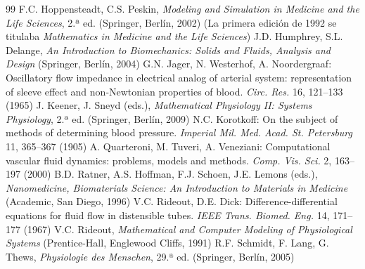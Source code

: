 \documentclass[12pt]{book}
\begin{document}
\begin{thebibliography}{99}
   F.C. Hoppensteadt, C.S. Peskin, \textit{Modeling and Simulation in Medicine and the Life Sciences}, 2.ª ed. (Springer, Berlín, 2002) (La primera edición de 1992 se titulaba \textit{Mathematics in Medicine and the Life Sciences})
   J.D. Humphrey, S.L. Delange, \textit{An Introduction to Biomechanics: Solids and Fluids, Analysis and Design} (Springer, Berlín, 2004)
   G.N. Jager, N. Westerhof, A. Noordergraaf: Oscillatory flow impedance in electrical analog of arterial system: representation of sleeve effect and non-Newtonian properties of blood. \textit{Circ. Res.} 16, 121--133 (1965)
   J. Keener, J. Sneyd (eds.), \textit{Mathematical Physiology II: Systems Physiology}, 2.ª ed. (Springer, Berlín, 2009)
   N.C. Korotkoff: On the subject of methods of determining blood pressure. \textit{Imperial Mil. Med. Acad. St. Petersburg} 11, 365--367 (1905)
   A. Quarteroni, M. Tuveri, A. Veneziani: Computational vascular fluid dynamics: problems, models and methods. \textit{Comp. Vis. Sci.} 2, 163--197 (2000)
   B.D. Ratner, A.S. Hoffman, F.J. Schoen, J.E. Lemons (eds.), \textit{Nanomedicine, Biomaterials Science: An Introduction to Materials in Medicine} (Academic, San Diego, 1996)
   V.C. Rideout, D.E. Dick: Difference-differential equations for fluid flow in distensible tubes. \textit{IEEE Trans. Biomed. Eng.} 14, 171--177 (1967)
   V.C. Rideout, \textit{Mathematical and Computer Modeling of Physiological Systems} (Prentice-Hall, Englewood Cliffs, 1991)
   R.F. Schmidt, F. Lang, G. Thews, \textit{Physiologie des Menschen}, 29.ª ed. (Springer, Berlín, 2005)
\end{thebibliography}

\end{document}
